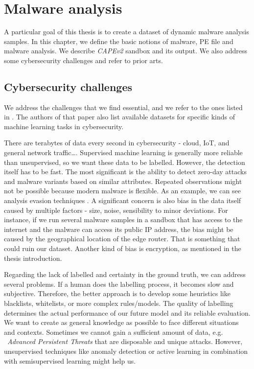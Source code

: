 \chapter{Malware analysis} \label{chap:analysis}
A particular goal of this thesis is to create a dataset of dynamic malware analysis samples. In this chapter, we define the basic notions of malware, PE file and malware analysis. We describe \emph{CAPEv2} sandbox and its output. We also address some cybersecurity challenges and refer to prior arts.

\section{Cybersecurity challenges}
We address the challenges that we find essential, and we refer to the ones listed in \cite{Amit2019}. The authors of that paper also list available datasets for specific kinds of machine learning tasks in cybersecurity.

There are terabytes of data every second in cybersecurity - cloud, IoT, and general network traffic\dots. Supervised machine learning is generally more reliable than unsupervised, so we want these data to be labelled. However, the detection itself has to be fast. The most significant is the ability to detect zero-day attacks and malware variants based on similar attributes. Repeated observations might not be possible because modern malware is flexible. As an example, we can see analysis evasion techniques \cite{Afianian2018}. A significant concern is also bias in the data itself caused by multiple factors - size, noise, sensibility to minor deviations. For instance, if we run several malware samples in a sandbox that has access to the internet and the malware can access its public IP address, the bias might be caused by the geographical location of the edge router. That is something that could ruin our dataset. Another kind of bias is encryption, as mentioned in the thesis introduction.

Regarding the lack of labelled and certainty in the ground truth, we can address several problems. If a human does the labelling process, it becomes slow and subjective. Therefore, the better approach is to develop some heuristics like blacklists, whitelists, or more complex rules/models. The quality of labelling determines the actual performance of our future model and its reliable evaluation. We want to create as general knowledge as possible to face different situations and contexts. Sometimes we cannot gain a sufficient amount of data, e.g. \  \emph{Advanced Persistent Threats} that are disposable and unique attacks. However, unsupervised techniques like anomaly detection or active learning in combination with semisupervised learning might help us.

